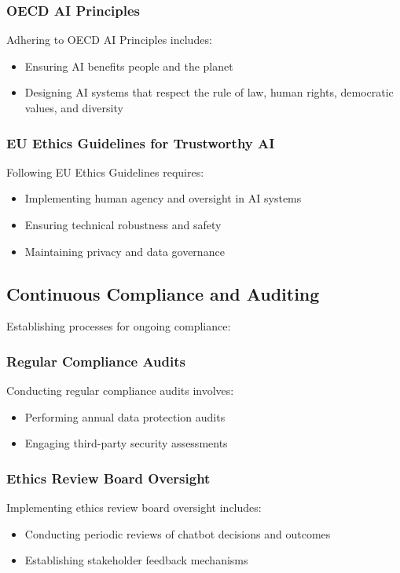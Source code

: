 \documentclass[15pt,a4paper]{article}
\begin{document}
\begin{multicols}{2}
\subsubsection*{OECD AI Principles}
Adhering to OECD AI Principles \textit{\parencite{OECD2023}} includes:
\begin{itemize}
    \item Ensuring AI benefits people and the planet
    \item Designing AI systems that respect the rule of law, human rights, democratic values, and diversity
\end{itemize}

\subsubsection*{EU Ethics Guidelines for Trustworthy AI}
Following EU Ethics Guidelines \textit{\parencite{EC2024}} requires:
\begin{itemize}
    \item Implementing human agency and oversight in AI systems
    \item Ensuring technical robustness and safety
    \item Maintaining privacy and data governance
\end{itemize}

\subsection{Continuous Compliance and Auditing}
Establishing processes for ongoing compliance:

\subsubsection*{Regular Compliance Audits}
Conducting regular compliance audits \textit{\parencite{ICO2024}} involves:
\begin{itemize}
    \item Performing annual data protection audits
    \item Engaging third-party security assessments
\end{itemize}

\subsubsection*{Ethics Review Board Oversight}
Implementing ethics review board oversight \textit{\parencite{AIEthicsBoard2024}} includes:
\begin{itemize}
    \item Conducting periodic reviews of chatbot decisions and outcomes
    \item Establishing stakeholder feedback mechanisms
\end{itemize}


\end{multicols}
\end{document}
